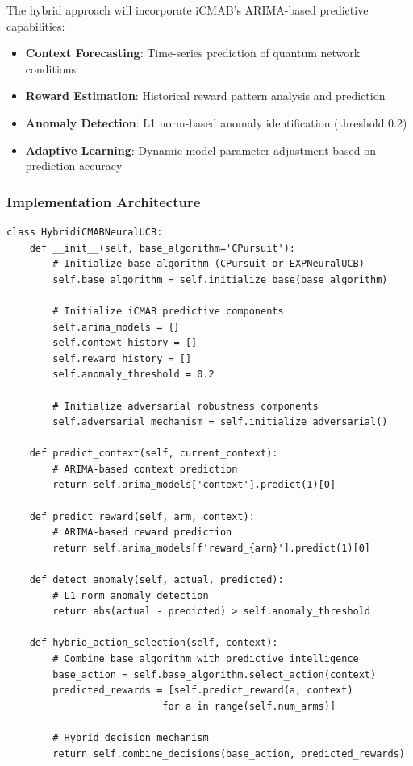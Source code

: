 \documentclass[12pt,a4paper]{article}
\begin{document}
The hybrid approach will incorporate iCMAB's ARIMA-based predictive capabilities:

\begin{itemize}
\item \textbf{Context Forecasting}: Time-series prediction of quantum network conditions
\item \textbf{Reward Estimation}: Historical reward pattern analysis and prediction
\item \textbf{Anomaly Detection}: L1 norm-based anomaly identification (threshold 0.2)
\item \textbf{Adaptive Learning}: Dynamic model parameter adjustment based on prediction accuracy
\end{itemize}

\subsubsection{Implementation Architecture}

\begin{lstlisting}[caption=Hybrid iCMAB Integration Framework]
class HybridiCMABNeuralUCB:
    def __init__(self, base_algorithm='CPursuit'):
        # Initialize base algorithm (CPursuit or EXPNeuralUCB)
        self.base_algorithm = self.initialize_base(base_algorithm)
        
        # Initialize iCMAB predictive components
        self.arima_models = {}
        self.context_history = []
        self.reward_history = []
        self.anomaly_threshold = 0.2
        
        # Initialize adversarial robustness components
        self.adversarial_mechanism = self.initialize_adversarial()
    
    def predict_context(self, current_context):
        # ARIMA-based context prediction
        return self.arima_models['context'].predict(1)[0]
    
    def predict_reward(self, arm, context):
        # ARIMA-based reward prediction
        return self.arima_models[f'reward_{arm}'].predict(1)[0]
    
    def detect_anomaly(self, actual, predicted):
        # L1 norm anomaly detection
        return abs(actual - predicted) > self.anomaly_threshold
    
    def hybrid_action_selection(self, context):
        # Combine base algorithm with predictive intelligence
        base_action = self.base_algorithm.select_action(context)
        predicted_rewards = [self.predict_reward(a, context) 
                           for a in range(self.num_arms)]
        
        # Hybrid decision mechanism
        return self.combine_decisions(base_action, predicted_rewards)
\end{lstlisting}
\end{document}

